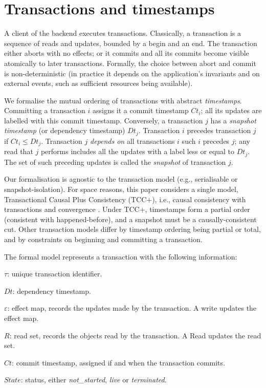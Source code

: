 \documentclass[systeme,french,english]{compas2022}
\begin{document}
\section{Transactions and timestamps}
\label{sec:transactions}


A client of the backend executes transactions.
Classically, a transaction is a sequence of reads and updates, bounded by
a begin and an end.
The transaction either aborts with no effects; or it commits and all its
commits become visible atomically to later transactions.
Formally, the choice between abort and commit is non-deterministic (in
practice it depends on the application's invariants and on external
events, such as sufficient resources being available).

We formalise the mutual ordering of transactions with abstract
\emph{timestamps}.
Committing a transaction $i$ assigns it a commit timestamp
$\mathit{Ct}_{i}$; all its updates are labelled with this commit
timestamp.
Conversely, a transaction $j$  has a \emph{snapshot timestamp} (or dependency
timestamp) $\mathit{Dt}_{j}$.
Transaction $i$ precedes transaction $j$ if $\mathit{Ct}_{i} \le
\mathit{Dt}_{j}$.
Transaction $j$ \emph{depends on} all transactions $i$ such $i$ precedes
$j$; any read that $j$ performs includes all the updates with a label
less or equal to $\mathit{Dt}_{j}$.
The set of such preceding updates is called the \emph{snapshot} of
transaction $j$.
 
Our formalisation is agnostic to the transaction model (e.g.,
serialisable or snapshot-isolation).
For space reasons, this paper considers a single model, Transactional
Causal Plus Consistency (TCC+), i.e., causal consistency with
transactions and convergence \cite{rep:syn:sh228,rep:pro:sh182}.
Under TCC+, timestamps form a partial order (consistent with
happened-before), and a snapshot must be a causally-consistent cut.
Other transaction models differ by timestamp ordering being partial or
total, and by constraints on beginning and committing a transaction.

The formal model represents a transaction with the following information:
\begin{compactitem}
\item $\tau$: unique transaction identifier.
\item $\mathit{Dt}$: dependency timestamp.
\item {$\varepsilon$}: effect map, records the updates made by the
  transaction.
  A write updates the effect map.
\item ${R}$: read set, records the objects read by the transaction.
  A Read updates the read set.
\item $\mathit{Ct}$: commit timestamp, assigned if and when the
  transaction commits.
\item $\mathit{State}$: status, either \emph{not\_started}, \emph{live} or \emph{terminated}.\\
\end{compactitem}
\end{document}
